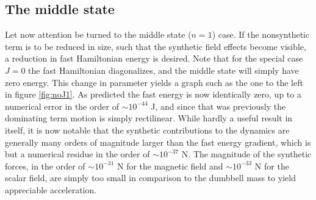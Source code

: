 \documentclass[main.tex]{subfiles}
\begin{document}
\subsection{The middle state}\label{sec:resmiddle}
Let now attention be turned to the middle state (\(n = 1 \)) case. If the nonsynthetic term is to be
reduced in size, such that the synthetic field effects become visible, a reduction in fast
Hamiltonian energy is desired. Note that for the special case \(J = 0\) the fast
Hamiltonian diagonalizes, and the middle state will simply have zero energy. This
change in parameter yields a graph such as the one to the left in figure \ref{fig:noJ1}. As predicted the fast
energy is now identically zero, up to a numerical error in the order of \(\sim 10^{-44}\) J, and since that was previously the dominating term motion is
simply rectilinear. While hardly a useful result in itself, it is now notable that the
synthetic contributions to the dynamics are generally many orders of magnitude larger than the
fast energy gradient, which is but a numerical residue in the order of \(\sim 10^{-37}\) N.
The magnitude of the synthetic forces, in the order of \(\sim 10^{-31}\) N for the magnetic
field
and \(\sim 10^{-33}\) N for the scalar field, are simply too small in comparison to the
dumbbell mass to yield appreciable acceleration.
\end{document}
